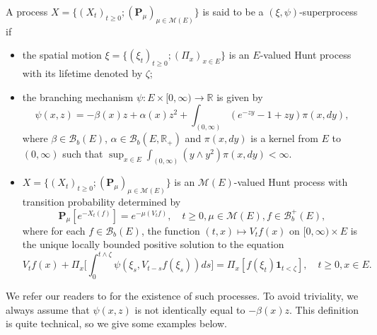 \documentclass[UTF8]{pkuthss}
\theoremstyle{plain}
\theoremstyle{definition}
\numberwithin{equation}{section}
\begin{document}
	A process $X=\{(X_t)_{t\geq 0}; (\mathbf P_\mu)_{\mu \in \mathcal M(E)}\}$ is said to be a $(\xi,\psi)$-superprocess if
\begin{itemize}
\item
    the spatial motion $\xi=\{(\xi_t)_{t\geq 0};(\Pi_x)_{x\in E}\}$ is an $E$-valued Hunt process with its lifetime denoted by $\zeta$;
\item
    the branching mechanism $\psi: E\times[0,\infty) \to \mathbb R$ is given by
\begin{equation}
    \psi(x,z)=
    -\beta(x) z + \alpha (x) z^2 + \int_{(0,\infty)} (e^{-zy} - 1 + zy) \pi(x,dy),
\end{equation}
    where $\beta \in \mathcal B_b(E)$, $\alpha \in \mathcal B_b(E, \mathbb R_+)$ and $\pi(x,dy)$ is a kernel from $E$ to $(0,\infty)$ such that $\sup_{x\in E} \int_{(0,\infty)} (y\wedge y^2) \pi(x,dy) < \infty$.
\item
    $X=\{(X_t)_{t\geq 0}; (\mathbf P_\mu)_{\mu \in \mathcal M(E)}\}$ is an $\mathcal M(E)$-valued Hunt process with transition probability determined by
\begin{equation}
    \mathbf P_\mu [e^{-X_t(f)}] = e^{-\mu(V_tf)},
    \quad t\geq 0, \mu \in \mathcal M(E), f\in \mathcal B^+_b(E),
\end{equation}
    where for each $f\in \mathcal B_b(E)$, the function $(t,x)\mapsto V_tf(x)$ on $[0,\infty) \times E$ is the unique locally bounded positive solution to the equation
\begin{equation}\label{eq:FKPP_in_definition}
    V_tf(x) + \Pi_x \Big[  \int_0^{t\wedge \zeta} \psi(\xi_s,V_{t-s}f(\xi_s))ds \Big]
    = \Pi_x [ f(\xi_t)\mathbf 1_{t<\zeta} ],
    \quad t \geq 0, x \in E.
\end{equation}
\end{itemize}
    We refer our readers to \cite{Li2011MeasureValued} for the existence of such processes.
    To avoid triviality, we always assume that
    $\psi(x,z)$ is not identically equal to $-\beta(x)z$.
    This definition is quite technical, so we give some examples below.
\end{document}
